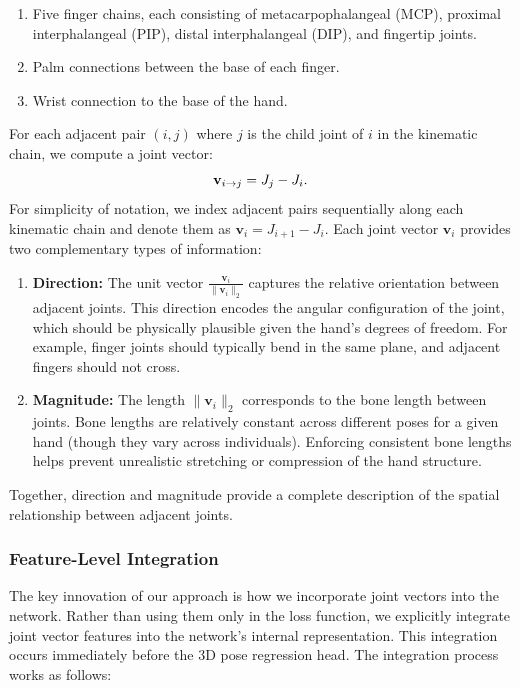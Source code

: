 \begin{enumerate}
    \item[(a)] Five finger chains, each consisting of metacarpophalangeal (MCP), proximal interphalangeal (PIP), distal interphalangeal (DIP), and fingertip joints.
    \item[(b)] Palm connections between the base of each finger.
    \item[(c)] Wrist connection to the base of the hand.
\end{enumerate}

For each adjacent pair \((i, j)\) where \(j\) is the child joint of \(i\) in the kinematic chain, we compute a joint vector:
\begin{equation}
\small
\mathbf{v}_{i \rightarrow j} = J_j - J_i .
\end{equation}
For simplicity of notation, we index adjacent pairs sequentially along each kinematic chain and denote them as \(\mathbf{v}_i = J_{i+1} - J_i\).
Each joint vector \(\mathbf{v}_i\) provides two complementary types of information:

\begin{enumerate}
    \item[(a)] \textbf{Direction:} The unit vector \(\frac{\mathbf{v}_i}{\|\mathbf{v}_i\|_2}\) captures the relative orientation between adjacent joints. This direction encodes the angular configuration of the joint, which should be physically plausible given the hand's degrees of freedom. For example, finger joints should typically bend in the same plane, and adjacent fingers should not cross.

    \item[(b)] \textbf{Magnitude:} The length \(\|\mathbf{v}_i\|_2\) corresponds to the bone length between joints. Bone lengths are relatively constant across different poses for a given hand (though they vary across individuals). Enforcing consistent bone lengths helps prevent unrealistic stretching or compression of the hand structure.
\end{enumerate}

Together, direction and magnitude provide a complete description of the spatial relationship between adjacent joints.

\subsubsection{Feature-Level Integration}
The key innovation of our approach is how we incorporate joint vectors into the network. Rather than using them only in the loss function, we explicitly integrate joint vector features into the network's internal representation. This integration occurs immediately before the 3D pose regression head.
The integration process works as follows:

